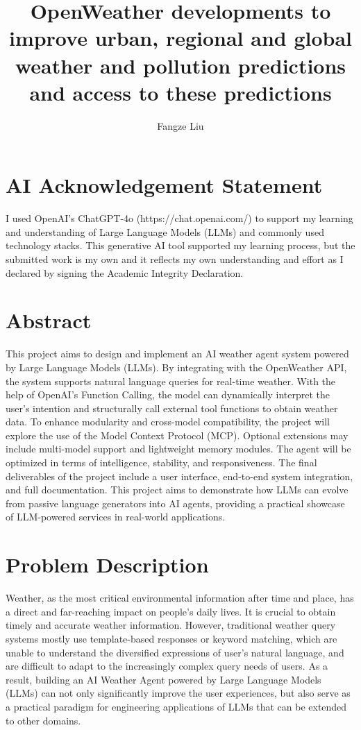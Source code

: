 \documentclass[project-plan]{report-template}
\title{OpenWeather developments to improve urban, regional and global weather and pollution predictions and access to these predictions}
\author{Fangze Liu}
\begin{document}
\maketitlepage  %

\section*{AI Acknowledgement Statement}
I used OpenAI’s ChatGPT‑4o (https://chat.openai.com/) to support my learning and understanding of Large Language Models (LLMs) and commonly used technology stacks. This generative AI tool supported my learning process, but the submitted work is my own and it reflects my own understanding and effort as I declared by signing the Academic Integrity Declaration.

\section*{Abstract}
This project aims to design and implement an AI weather agent system powered by Large Language Models (LLMs). By integrating with the OpenWeather API, the system supports natural language queries for real-time weather. With the help of OpenAI's Function Calling, the model can dynamically interpret the user's intention and structurally call external tool functions to obtain weather data. To enhance modularity and cross-model compatibility, the project will explore the use of the Model Context Protocol (MCP). Optional extensions may include multi-model support and lightweight memory modules. The agent will be optimized in terms of intelligence, stability, and responsiveness. The final deliverables of the project include a user interface, end-to-end system integration, and full documentation. This project aims to demonstrate how LLMs can evolve from passive language generators into AI agents, providing a practical showcase of LLM-powered services in real-world applications.

\section{Problem Description}
Weather, as the most critical environmental information after time and place, has a direct and far-reaching impact on people's daily lives. It is crucial to obtain timely and accurate weather information. However, traditional weather query systems mostly use template-based responses or keyword matching, which are unable to understand the diversified expressions of user's natural language, and are difficult to adapt to the increasingly complex query needs of users. As a result, building an AI Weather Agent powered by Large Language Models (LLMs) can not only significantly improve the user experiences, but also serve as a practical paradigm for engineering applications of LLMs that can be extended to other domains.
\end{document}
